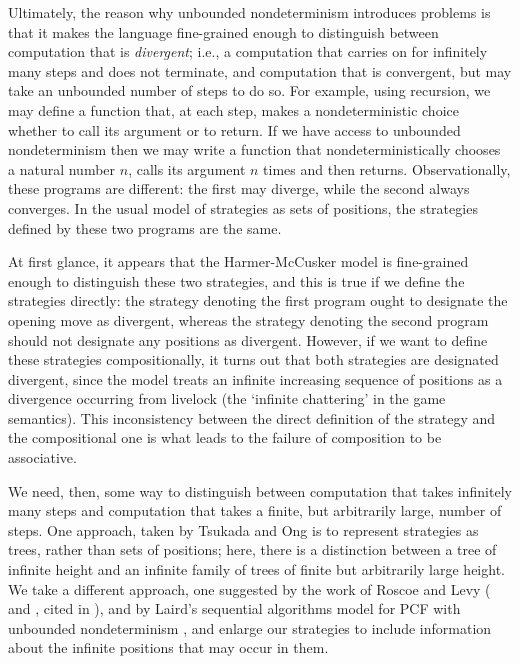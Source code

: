 \documentclass{article}
\begin{document}
Ultimately, the reason why unbounded nondeterminism introduces problems is that it makes the language fine-grained enough to distinguish between computation that is \emph{divergent}; i.e., a computation that carries on for infinitely many steps and does not terminate, and computation that is convergent, but may take an unbounded number of steps to do so.  For example, using recursion, we may define a function that, at each step, makes a nondeterministic choice whether to call its argument or to return.  If we have access to unbounded nondeterminism then we may write a function that nondeterministically chooses a natural number $n$, calls its argument $n$ times and then returns.  Observationally, these programs are different: the first may diverge, while the second always converges.  In the usual model of strategies as sets of positions, the strategies defined by these two programs are the same.  

At first glance, it appears that the Harmer-McCusker model is fine-grained enough to distinguish these two strategies, and this is true if we define the strategies directly: the strategy denoting the first program ought to designate the opening move as divergent, whereas the strategy denoting the second program should not designate any positions as divergent.  However, if we want to define these strategies compositionally, it turns out that both strategies are designated divergent, since the model treats an infinite increasing sequence of positions as a divergence occurring from livelock (the `infinite chattering' in the game semantics).  This inconsistency between the direct definition of the strategy and the compositional one is what leads to the failure of composition to be associative.  

We need, then, some way to distinguish between computation that takes infinitely many steps and computation that takes a finite, but arbitrarily large, number of steps.  One approach, taken by Tsukada and Ong \cite{TsukadaSheaves} is to represent strategies as trees, rather than sets of positions; here, there is a distinction between a tree of infinite height and an infinite family of trees of finite but arbitrarily large height.  We take a different approach, one suggested by the work of Roscoe and Levy (\cite{RoscoeCspInfinite} and \cite{LevyGsInfinite}, cited in \cite{TsukadaSheaves}), and by Laird's sequential algorithms model for PCF with unbounded nondeterminism \cite{LairdOrdinalGames}, and enlarge our strategies to include information about the infinite positions that may occur in them.  
\end{document}
